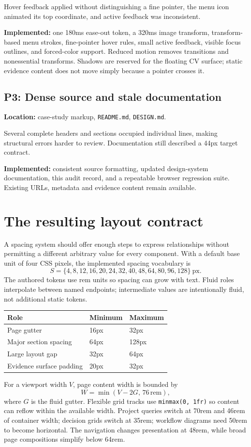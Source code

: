 \documentclass[11pt,a4paper]{article}
\newcommand{\file}[1]{\nolinkurl{#1}}
\begin{document}
Hover feedback applied without distinguishing a fine pointer, the menu icon animated its top coordinate, and active feedback was inconsistent.

\textbf{Implemented:} one 180ms ease-out token, a 320ms image transform, transform-based menu strokes, fine-pointer hover rules, small active feedback, visible focus outlines, and forced-color support. Reduced motion removes transitions and nonessential transforms. Shadows are reserved for the floating CV surface; static evidence content does not move simply because a pointer crosses it.

\subsection{P3: Dense source and stale documentation}
\textbf{Location:} case-study markup, \file{README.md}, \file{DESIGN.md}.

Several complete headers and sections occupied individual lines, making structural errors harder to review. Documentation still described a 44px target contract.

\textbf{Implemented:} consistent source formatting, updated design-system documentation, this audit record, and a repeatable browser regression suite. Existing URLs, metadata and evidence content remain available.

\section{The resulting layout contract}
A spacing system should offer enough steps to express relationships without permitting a different arbitrary value for every component. With a default base unit of four CSS pixels, the implemented spacing vocabulary is
\[
 S=\{4,8,12,16,20,24,32,40,48,64,80,96,128\}\ \mathrm{px}.
\]
The authored tokens use rem units so spacing can grow with text. Fluid roles interpolate between named endpoints; intermediate values are intentionally fluid, not additional static tokens.

\begin{center}
\begin{tabular}{lll}
\toprule
Role & Minimum & Maximum \\
\midrule
Page gutter & 16px & 32px \\
Major section spacing & 64px & 128px \\
Large layout gap & 32px & 64px \\
Evidence surface padding & 20px & 32px \\
\bottomrule
\end{tabular}
\end{center}
For a viewport width $V$, page content width is bounded by
\[
 W=\min\left(V-2G,\,76\,\mathrm{rem}\right),
\]
where $G$ is the fluid gutter. Flexible grid tracks use \file{minmax(0, 1fr)} so content can reflow within the available width. Project queries switch at 70rem and 46rem of container width; decision grids switch at 35rem; workflow diagrams need 50rem to become horizontal. The navigation changes presentation at 48rem, while broad page compositions simplify below 64rem.
\end{document}
